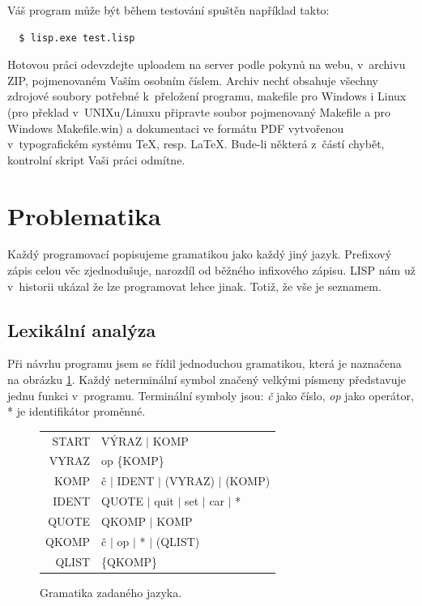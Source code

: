 \documentclass[a4paper, 12pt]{article}
\begin{document}
Váš program může být během testování spuštěn například takto:
\begin{verbatim}
  $ lisp.exe test.lisp
\end{verbatim}

Hotovou práci odevzdejte uploadem na server podle pokynů na webu, v~archivu
ZIP, pojmenovaném Vaším osobním číslem. Archiv nechť obsahuje všechny
zdrojové soubory potřebné k~přeložení programu, \textsf{makefile} pro
Windows i Linux (pro překlad v~UNIXu/Linuxu připravte soubor pojmenovaný
\textsf{Makefile} a pro Windows \textsf{Makefile.win}) a dokumentaci ve
formátu PDF vytvořenou v~typografickém systému \TeX{}, resp. \LaTeX{}.
Bude-li některá z~částí chybět, kontrolní skript Vaši práci odmítne.

\section{Problematika}
Každý programovací popisujeme gramatikou jako každý jiný jazyk.
Prefixový zápis celou věc zjednodušuje, narozdíl od běžného infixového
zápisu. LISP nám už v~historii ukázal že lze programovat lehce jinak.
Totiž, že vše je seznamem.

\subsection{Lexikální analýza}
Při návrhu programu jsem se řídil jednoduchou gramatikou, která je
naznačena na obrázku \ref{fig:gram}. Každý neterminální symbol značený
velkými písmeny představuje jednu funkci v~programu. Terminální symboly
jsou: \emph{č} jako číslo, \emph{op} jako operátor, * je identifikátor
proměnné.

\begin{figure}
\centering
\begin{tabular}{r@{$\quad\longrightarrow\quad$}l}
START & VÝRAZ $|$ KOMP\\
VYRAZ & op \{KOMP\}\\
KOMP & č $|$ IDENT $|$ (VYRAZ) $|$ (KOMP)\\
IDENT & QUOTE $|$ quit $|$ set $|$ car $|$ *\\[1ex]
QUOTE & QKOMP $|$ KOMP\\
QKOMP & č $|$ op $|$ * $|$ (QLIST)\\
QLIST & \{QKOMP\}

\end{tabular}

\caption{Gramatika zadaného jazyka.}
\label{fig:gram}
\end{figure}
\end{document}
